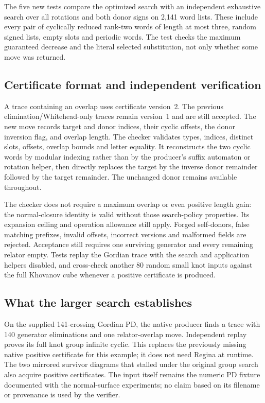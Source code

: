 The five new tests compare the optimized search with an independent
exhaustive search over all rotations and both donor signs on 2,141 word
lists.  These include every pair of cyclically reduced rank-two words of
length at most three, random signed lists, empty slots and periodic words.
The test checks the maximum guaranteed decrease and the literal selected
substitution, not only whether some move was returned.

\subsection{Certificate format and independent verification}

A trace containing an overlap uses certificate version~2.  The previous
elimination/Whitehead-only traces remain version~1 and are still accepted.
The new move records target and donor indices, their cyclic offsets, the
donor inversion flag, and overlap length.  The checker validates types,
indices, distinct slots, offsets, overlap bounds and letter equality.
It reconstructs the two cyclic words by modular indexing rather than by
the producer's suffix automaton or rotation helper, then directly replaces
the target by the inverse donor remainder followed by the target remainder.
The unchanged donor remains available throughout.

The checker does not require a maximum overlap or even positive length
gain: the normal-closure identity is valid without those search-policy
properties.  Its expansion ceiling and operation allowance still apply.
Forged self-donors, false matching prefixes, invalid offsets, incorrect
versions and malformed fields are rejected.  Acceptance still requires
one surviving generator and every remaining relator empty.  Tests replay
the Gordian trace with the search and application helpers disabled, and
cross-check another 80 random small knot inputs against the full Khovanov
cube whenever a positive certificate is produced.

\subsection{What the larger search establishes}

On the supplied 141-crossing Gordian PD, the native producer finds a trace
with 140 generator eliminations and one relator-overlap move.  Independent
replay proves its full knot group infinite cyclic.  This replaces the
previously missing native positive certificate for this example; it does
not need Regina at runtime.  The two mirrored survivor diagrams that
stalled under the original group search also acquire positive certificates.
The input itself remains the numeric PD fixture documented with the
normal-surface experiments; no claim based on its filename or provenance
is used by the verifier.

